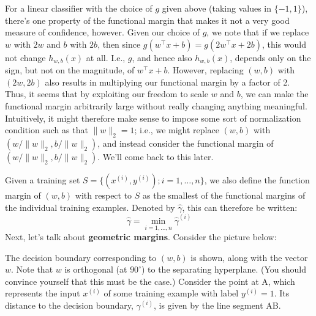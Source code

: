 For a linear classifier with the choice of $g$ given above (taking values in
$\{-1,1\}$), there's one property of the functional margin that makes it not a
very good measure of confidence, however. Given our choice of $g$, we note that
if we replace $w$ with $2w$ and $b$ with $2b$, then since $g(w^\top x+b) = g(2w^\top x + 2b)$,
this would not change $h_{w,b}(x)$ at all. I.e., $g$, and hence also $h_{w,b} (x)$, depends
only on the sign, but not on the magnitude, of $w^\top x + b$. However, replacing
$(w,b)$ with $(2w,2b)$ also results in multiplying our functional margin by a
factor of 2. Thus, it seems that by exploiting our freedom to scale $w$ and $b$,
we can make the functional margin arbitrarily large without really changing
anything meaningful. Intuitively, it might therefore make sense to impose
some sort of normalization condition such as that $\lVert w \rVert_2 = 1$; i.e., we might
replace $(w,b)$ with $(w/\lVert w \rVert_2, b/\lVert w \rVert_2)$, and instead consider the functional
margin of $(w/\lVert w \lVert_2 ,b/\lVert w \lVert_2)$. We'll come back to this later.

Given a training set $S = \{(x^{(i)} ,y^{(i)} );i = 1,\ldots ,n\}$, we also define the
function margin of $(w,b)$ with respect to $S$ as the smallest of the functional
margins of the individual training examples. Denoted by $\hat{\gamma}$, this can therefore
be written:
\begin{equation*}
    \hat{\gamma} = \min_{i=1,\ldots ,n} \hat{\gamma}^{(i)} %
\end{equation*}
Next, let's talk about \textbf{geometric margins}. Consider the picture below:


The decision boundary corresponding to $(w,b)$ is shown, along with the
vector $w$. Note that $w$ is orthogonal (at $90^\circ$) to the separating hyperplane.
(You should convince yourself that this must be the case.) Consider the
point at A, which represents the input $x^{(i)}$ of some training example with
label $y^{(i)} = 1$. Its distance to the decision boundary, $\gamma^{(i)}$, is given by the line
segment AB.

